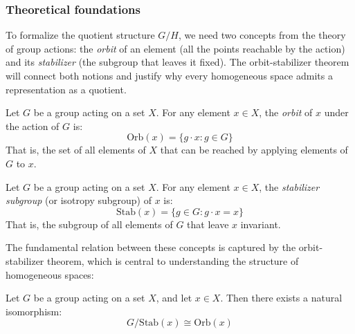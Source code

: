 \subsubsection{Theoretical foundations}

To formalize the quotient structure $G/H$, we need two concepts from the theory of group actions: the \textit{orbit} of an element (all the points reachable by the action) and its \textit{stabilizer} (the subgroup that leaves it fixed). The orbit-stabilizer theorem will connect both notions and justify why every homogeneous space admits a representation as a quotient.

\begin{definition}[Orbit]\label{def:orbita}
Let $G$ be a group acting on a set $X$. For any element $x \in X$, the \textit{orbit} of $x$ under the action of $G$ is:
\begin{equation}
\text{Orb}(x) = \{g \cdot x : g \in G\}
\end{equation}
That is, the set of all elements of $X$ that can be reached by applying elements of $G$ to $x$.
\end{definition}

\begin{definition}\label{def:estabilizador}
Let $G$ be a group acting on a set $X$. For any element $x \in X$, the \textit{stabilizer subgroup} (or isotropy subgroup) of $x$ is:
\begin{equation}
\text{Stab}(x) = \{g \in G : g \cdot x = x\}
\end{equation}
That is, the subgroup of all elements of $G$ that leave $x$ invariant.
\end{definition}

The fundamental relation between these concepts is captured by the orbit-stabilizer theorem, which is central to understanding the structure of homogeneous spaces:

\begin{theorem}\label{thm:orbita_estabilizador}
Let $G$ be a group acting on a set $X$, and let $x \in X$. Then there exists a natural isomorphism:
\begin{equation}
G/\text{Stab}(x) \cong \text{Orb}(x)
\end{equation}
\end{theorem}

